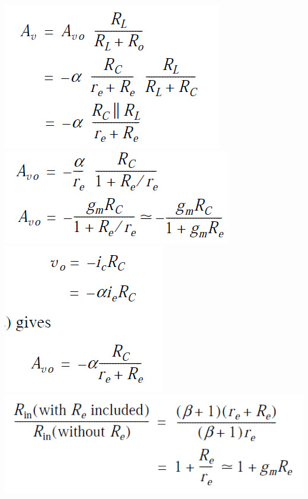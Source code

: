 \documentclass[a4paper]{article}
\begin{document}
\begin{multicols}{3}
\includegraphics[width=\linewidth]{imgs/1}
\includegraphics[width=\linewidth]{imgs/2}
\includegraphics[width=\linewidth]{imgs/3}
\includegraphics[width=\linewidth]{imgs/4}


\end{multicols}
\end{document}
